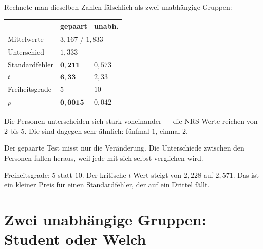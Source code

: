 \begin{merksatz}
Rechnete man dieselben Zahlen fälschlich als zwei unabhängige Gruppen:

\begin{center}
\renewcommand{\arraystretch}{1.48}
\begin{tabular}{@{}P{3.4cm}P{1.8cm}P{2.2cm}@{}}
\toprule
& \textbf{gepaart} & \textbf{unabh.}\\
\midrule
Mittelwerte & \\
Unterschied & \\
Standard\-fehler & $\mathbf{0{,}211}$ & $0{,}573$\\
$t$ & $\mathbf{6{,}33}$ & $2{,}33$\\
Freiheitsgrade & $5$ & $10$\\
$p$ & $\mathbf{0{,}0015}$ & $0{,}042$\\
\bottomrule
\end{tabular}
\end{center}

Die Personen unterscheiden sich stark voneinander --- die NRS-Werte reichen von $2$ bis $5$. Die  sind dagegen sehr ähnlich: fünfmal $1$, einmal $2$.

Der gepaarte Test misst nur die Veränderung. Die Unterschiede zwischen den Personen fallen heraus, weil jede mit sich selbst verglichen wird.

\begin{center}
\begin{minipage}{0.88\textwidth}
\end{minipage}
\end{center}

Freiheitsgrade: $5$ statt $10$. Der kritische $t$-Wert steigt von $2{,}228$ auf $2{,}571$. Das ist ein kleiner Preis für einen Standardfehler, der auf ein Drittel fällt.
\end{merksatz}

\section{Zwei unabhängige Gruppen: Student oder Welch}

